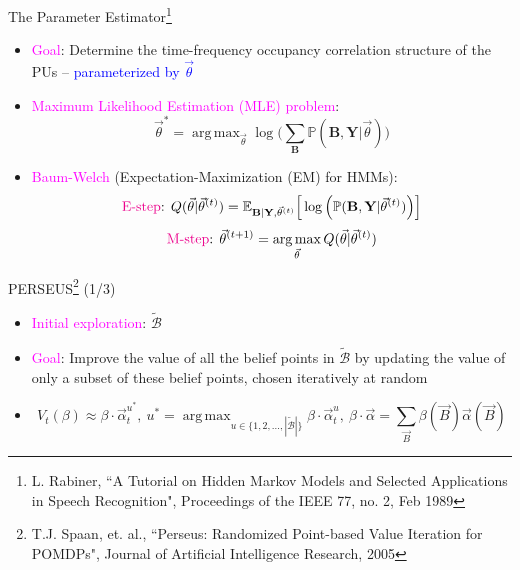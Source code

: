 \documentclass{beamer}
\DeclareMathOperator*{\argmax}{arg\,max}
\begin{document}
\begin{frame}{The Parameter Estimator\footnote{\tiny{L. Rabiner, ``A Tutorial on Hidden Markov Models and Selected Applications in Speech Recognition", Proceedings of the IEEE 77, no. 2, Feb 1989}}}
    \begin{itemize}
        \item \textcolor{magenta}{Goal}: Determine the time-frequency occupancy correlation structure of the PUs -- \textcolor{blue}{parameterized by $\vec{\theta}$}
        \item \textcolor{magenta}{Maximum Likelihood Estimation (MLE) problem}:
        \[\vec{\theta}^{*} = \argmax_{\vec{\theta}} \log\Big(\sum_{\mathbf{B}} \mathbb{P}(\mathbf{B}, \mathbf{Y}| \vec{\theta})\Big)\]
        \item \textcolor{magenta}{Baum-Welch} (Expectation-Maximization (EM) for HMMs):
        \[\text{\textcolor{magenta}{E-step}: }Q(\vec{\theta}|\vec{\theta}^{(t)}) = \mathbb{E}_{\mathbf{B}|\mathbf{Y}, \vec{\theta}^{(t)}} \Big[ \log \Big(\mathbb{P}(\mathbf{B}, \mathbf{Y}|\vec{\theta}^{(t)})\Big)\Big]\]
        \[\text{\textcolor{magenta}{M-step}: }\vec{\theta}^{(t+1)} = \argmax_{\vec{\theta}} Q(\vec{\theta}|\vec{\theta}^{(t)})\]
    \end{itemize}
\end{frame}
\begin{frame}{PERSEUS\footnote{\tiny{T.J. Spaan, et. al., ``Perseus: Randomized Point-based Value Iteration for POMDPs", Journal of Artificial Intelligence Research, 2005}} (1/3)}
\begin{itemize}
        \item \textcolor{magenta}{Initial exploration}: $\tilde{\mathcal{B}}$
        \item \textcolor{magenta}{Goal}: Improve the value of all the belief points in $\tilde{\mathcal{B}}$ by updating the value of only a subset of these belief points, chosen iteratively at random
        \item \[V_{t}(\beta) \approx \beta \cdot \vec{\alpha}_{t}^{u^*},\ u^* = \argmax_{u\in\{1,2,\dots,|\tilde{\mathcal{B}}|\}} \beta \cdot \vec{\alpha}_{t}^{u},\ \beta\cdot\vec{\alpha}{=}\sum_{\vec{B}}\beta(\vec{B})\vec{\alpha}(\vec{B})\]
\end{itemize}
\end{frame}
\end{document}
